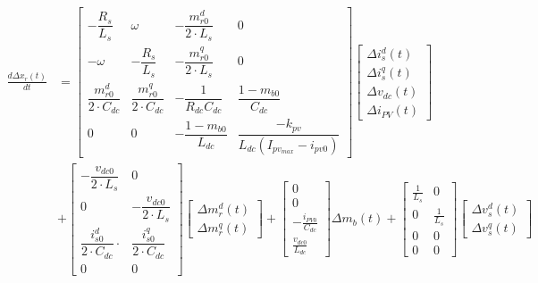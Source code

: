 \documentclass[11pt, a4paper]{article}
\newcommand{\der}[1]{\frac{d #1(t)}{dt}}
\begin{document}
\begin{align*}
    \der{\Delta x_r}
    &=
    \begin{bmatrix}
        -\dfrac{R_s}{L_s} & \omega & -\dfrac{m_{r0}^d}{2 \cdot L_s}  & 0 \\
        -\omega & -\dfrac{R_s}{L_s} & -\dfrac{m_{r0}^q}{2 \cdot L_s} & 0 \\
        \dfrac{m_{r0}^d}{2 \cdot C_{dc}} & \dfrac{m_{r0}^q}{2 \cdot C_{dc}} & -\dfrac{1}{R_{dc} C_{dc}} & \dfrac{1 - m_{b0}}{C_{dc}} \\
        0 & 0 & -\dfrac{1 - m_{b0}}{L_{dc}} & \dfrac{-k_{pv}}{L_{dc}(I_{pv_{max}} - i_{pv0})}
    \end{bmatrix}
    \begin{bmatrix}
        \Delta i_s^d(t) \\[10pt] \Delta i_s^q(t) \\[10pt] \Delta v_{dc}(t) \\[10pt] \Delta i_{PV}(t) 
    \end{bmatrix}
    \\ 
    &+\begin{bmatrix}
        -\dfrac{v_{dc0}}{2 \cdot L_s}  & 0 \\
        0 & -\dfrac{v_{dc0}}{2 \cdot L_s}  \\
        \dfrac{i_{s0}^d}{2 \cdot C_{dc}} \cdot & \dfrac{i_{s0}^q}{2 \cdot C_{dc}}  \\
        0 & 0
    \end{bmatrix}
    \begin{bmatrix}
        \Delta m_r^d(t) \\[10pt] \Delta m_r^q(t)
    \end{bmatrix}
    +
    \begin{bmatrix}
        0 \\[5pt] 0 \\[5pt] -\frac{i_{PV0}}{C_{dc}} \\[5pt] \frac{v_{dc0}}{L_{dc}}
    \end{bmatrix}
    \Delta m_b(t) + 
    \begin{bmatrix}
        \frac{1}{L_s} & 0 \\[5pt] 0 & \frac{1}{L_s} \\[5pt] 0 & 0 \\[5pt] 0 & 0
    \end{bmatrix}
    \begin{bmatrix}
        \Delta v_s^d(t) \\[10pt] \Delta v_s^q(t)
    \end{bmatrix}
\end{align*}
\end{document}
